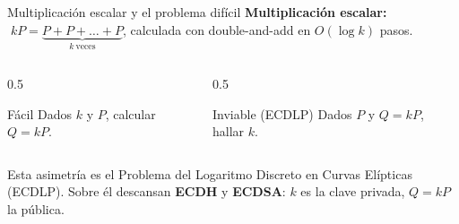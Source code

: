 \documentclass[aspectratio=169,11pt]{beamer}
\begin{document}
\begin{frame}{Multiplicación escalar y el problema difícil}
  \textbf{Multiplicación escalar:} $\;kP = \underbrace{P + P + \dots + P}_{k\ \text{veces}}$,
  calculada con \alert{double-and-add} en $O(\log k)$ pasos.
  \vfill
  \begin{columns}[c]
    \begin{column}{0.5\textwidth}
      \begin{exampleblock}{Fácil}
        Dados $k$ y $P$, calcular $Q = kP$.
      \end{exampleblock}
    \end{column}
    \begin{column}{0.5\textwidth}
      \begin{alertblock}{Inviable (ECDLP)}
        Dados $P$ y $Q=kP$, hallar $k$.
      \end{alertblock}
    \end{column}
  \end{columns}
  \vfill
  Esta asimetría es el \alert{Problema del Logaritmo Discreto en Curvas Elípticas (ECDLP)}.
  Sobre él descansan \textbf{ECDH} y \textbf{ECDSA}: $k$ es la clave privada, $Q=kP$ la
  pública.
\end{frame}
\end{document}
